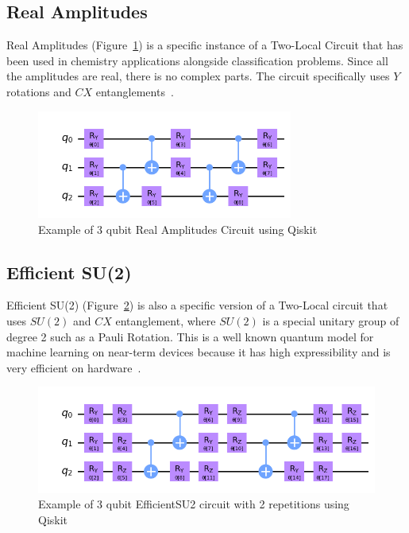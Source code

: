 \documentclass[11pt]{article}
\begin{document}
\subsection*{Real Amplitudes}

Real Amplitudes (Figure~\ref{fig:realamplitudes}) is a specific instance of a Two-Local Circuit that has been used in chemistry applications alongside classification problems. Since all the amplitudes are real,
there is no complex parts. The circuit specifically uses $Y$ rotations and $CX$ entanglements~\cite{ibmansatz}.

\begin{figure}[!h]
    \centering
    \includegraphics[width=0.75\textwidth]{./figures/realamplitudes.png} 
    \caption{Example of 3 qubit Real Amplitudes Circuit using Qiskit}
    \label{fig:realamplitudes}
\end{figure}

\subsection*{Efficient SU(2)}

Efficient SU(2) (Figure~\ref{fig:efficientsu2}) is also a specific version of a Two-Local circuit that uses $SU(2)$ and $CX$ entanglement, where $SU(2)$ is a special unitary group of degree 2 such as a Pauli
Rotation. This is a well known quantum model for machine learning on near-term devices because it has high expressibility and is very efficient on hardware~\cite{ibmansatz}.

\begin{figure}[!h]
    \centering
    \includegraphics[width=1\textwidth]{./figures/efficientsu2.png} 
    \caption{Example of 3 qubit EfficientSU2 circuit with 2 repetitions using Qiskit}
    \label{fig:efficientsu2}
\end{figure}
\end{document}

